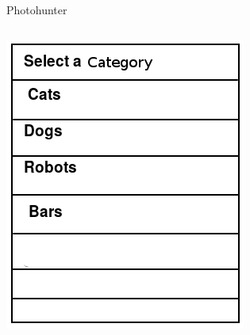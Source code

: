 \documentclass[aspectratio=169]{beamer}
\begin{document}
\begin{frame}{Photohunter}
  \begin{columns}[c]
    \begin{column}{0.5\columnwidth}
      \includegraphics[width=\columnwidth]{ss_photohunter_dataset}
    \end{column}
    \begin{column}{0.5\columnwidth}

\end{column}
\end{columns}
\end{frame}
\end{document}
